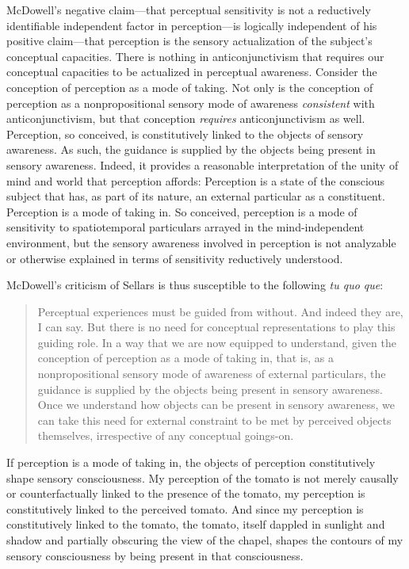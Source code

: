 \documentclass[12pt]{article}
\begin{document}
McDowell's negative claim---that perceptual sensitivity is not a reductively identifiable independent factor in perception---is logically independent of his positive claim---that perception is the sensory actualization of the subject's conceptual capacities. There is nothing in anticonjunctivism that requires our conceptual capacities to be actualized in perceptual awareness. Consider the conception of perception as a mode of taking. Not only is the conception of perception as a nonpropositional sensory mode of awareness \emph{consistent} with anticonjunctivism, but that conception \emph{requires} anticonjunctivism as well. Perception, so conceived, is constitutively linked to the objects of sensory awareness. As such, the guidance is supplied by the objects being present in sensory awareness. Indeed, it provides a reasonable interpretation of the unity of mind and world that perception affords: Perception is a state of the conscious subject that has, as part of its nature, an external particular as a constituent. Perception is a mode of taking in. So conceived, perception is a mode of sensitivity to spatiotemporal particulars arrayed in the mind-independent environment, but the sensory awareness involved in perception is not analyzable or otherwise explained in terms of sensitivity reductively understood.

McDowell's criticism of Sellars is thus susceptible to the following \emph{tu quo que}: 
\begin{quote}
    Perceptual experiences must be guided from without. And indeed they are, I can say. But there is no need for conceptual representations to play this guiding role. In a way that we are now equipped to understand, given the conception of perception as a mode of taking in, that is, as a nonpropositional sensory mode of awareness of external particulars, the guidance is supplied by the objects being present in sensory awareness. Once we understand how objects can be present in sensory awareness, we can take this need for external constraint to be met by perceived objects themselves, irrespective of any conceptual goings-on.
\end{quote}

If perception is a mode of taking in, the objects of perception constitutively shape sensory consciousness. My perception of the tomato is not merely causally or counterfactually linked to the presence of the tomato, my perception is constitutively linked to the perceived tomato. And since my perception is constitutively linked to the tomato, the tomato, itself dappled in sunlight and shadow and partially obscuring the view of the chapel, shapes the contours of my sensory consciousness by being present in that consciousness.
\end{document}
